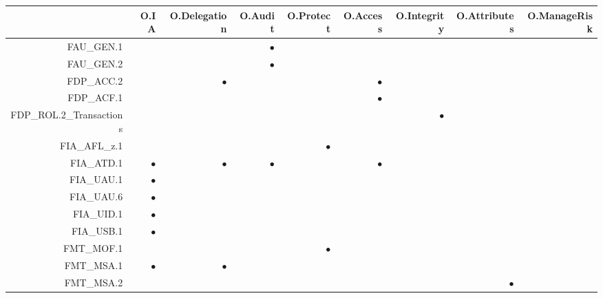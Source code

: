 \documentclass[12pt,english]{scrbook}
\newcommand{\oh}{$\bullet$}
\begin{document}
\begin{longtable}{rRRRRRRRR}
        \toprule
                            & O.IA & O.Delegation & O.Audit & O.Protect & O.Access & O.Integrity & O.Attributes & O.ManageRisk \\
        \midrule\endhead

FAU\_GEN.1                  &      &              & \oh     &           &          &             &              &              \\
FAU\_GEN.2                  &      &              & \oh     &           &          &             &              &              \\
FDP\_ACC.2                  &      & \oh          &         &           & \oh      &             &              &              \\
FDP\_ACF.1                  &      &              &         &           &  \oh     &             &              &              \\
FDP\_ROL.2\_Transactions    &      &              &         &           &          &   \oh       &              &              \\
FIA\_AFL\_z.1               &      &              &         &   \oh     &          &             &              &              \\
FIA\_ATD.1                  & \oh  &  \oh         &   \oh   &           & \oh      &             &              &              \\
FIA\_UAU.1                  & \oh  &              &         &           &          &             &              &              \\
FIA\_UAU.6                  & \oh  &              &         &           &          &             &              &              \\
FIA\_UID.1                  & \oh  &              &         &           &          &             &              &              \\
FIA\_USB.1                  & \oh  &              &         &           &          &             &              &              \\
FMT\_MOF.1                  &      &              &         &  \oh      &          &             &              &              \\
FMT\_MSA.1                  & \oh  &  \oh         &         &           &          &             &              &              \\
FMT\_MSA.2                  &      &              &         &           &          &             &  \oh         &              \\  

\end{longtable}
\end{document}
